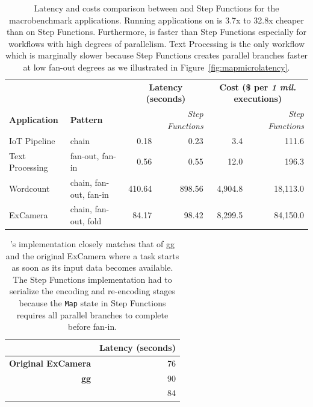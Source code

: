 \begin{table}[t]
\centering
\begin{tabular}{ll|rr|rr}
\hline
                     &                        & \multicolumn{2}{c}{\textbf{Latency (seconds)}}            & \multicolumn{2}{c}{\textbf{Cost (\$ per \emph{1 mil.} executions)}}       \\
\textbf{Application} & \textbf{Pattern}       & \textit{\name{}} & \textit{Step Functions}   & \textit{\name{}} & \textit{Step Functions}            \\ \hline
IoT Pipeline         & chain                  & 0.18       & 0.23       & 3.4       & 111.6   \\
Text Processing      & fan-out, fan-in        & 0.56       & 0.55       & 12.0      & 196.3   \\
Wordcount            & chain, fan-out, fan-in & 410.64     & 898.56     & 4,904.8   & 18,113.0 \\
ExCamera             & chain, fan-out, fold   & 84.17      & 98.42      & 8,299.5   & 84,150.0      \\ \hline
\end{tabular}
\caption{Latency and costs comparison between \name{} and Step Functions for
the macrobenchmark applications. Running applications on \name{} is 3.7x to
32.8x cheaper than on Step Functions. Furthermore, \name{} is faster than Step
Functions especially for workflows with high degrees of parallelism. Text
Processing is the only workflow which \name{} is marginally slower because
Step Functions creates parallel branches faster at low fan-out degrees as we
illustrated in Figure~\ref{fig:mapmicrolatency}.}
\label{table:macro}
\end{table}

\begin{table}[]
\centering
\begin{tabular}{|r|r|}
\hline
                                  & \textbf{Latency (seconds)} \\ \hline
\textbf{Original ExCamera}        & 76                         \\ \hline
\textbf{gg}                       & 90                         \\ \hline
\textbf{\name{}} & 84                         \\ \hline
\end{tabular}
\caption{\name{}'s implementation closely matches that of gg and the original
ExCamera where a task starts as soon as its input data becomes available. The
Step Functions implementation had to serialize the encoding and re-encoding
stages because the \texttt{Map} state in Step Functions requires all parallel
branches to complete before fan-in.}
\label{table:excamera}
\end{table}

